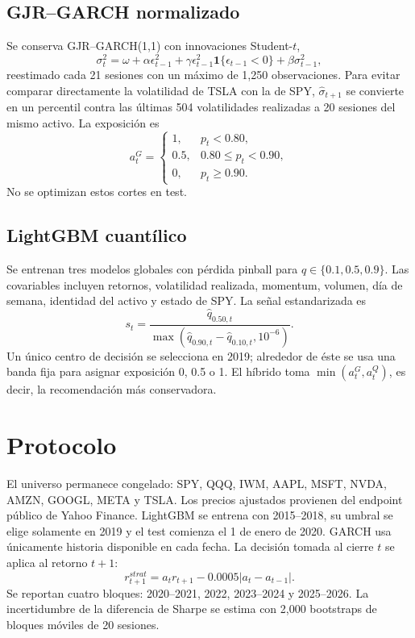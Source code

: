 \documentclass[11pt]{article}
\begin{document}
\subsection{GJR--GARCH normalizado}
Se conserva GJR--GARCH(1,1) con innovaciones Student-$t$,
\begin{equation}
 \sigma_t^2=\omega+\alpha\epsilon_{t-1}^2+
 \gamma\epsilon_{t-1}^2\mathbf 1\{\epsilon_{t-1}<0\}+\beta\sigma_{t-1}^2,
\end{equation}
reestimado cada 21 sesiones con un máximo de 1,250 observaciones. Para evitar comparar directamente la
volatilidad de TSLA con la de SPY, $\hat\sigma_{t+1}$ se convierte en un percentil contra las últimas 504
volatilidades realizadas a 20 sesiones del mismo activo. La exposición es
\begin{equation}
a_t^{G}=\begin{cases}
1,&p_t<0.80,\\
0.5,&0.80\le p_t<0.90,\\
0,&p_t\ge0.90.
\end{cases}
\end{equation}
No se optimizan estos cortes en test.

\subsection{LightGBM cuantílico}
Se entrenan tres modelos globales con pérdida pinball para $q\in\{0.1,0.5,0.9\}$. Las covariables incluyen
retornos, volatilidad realizada, momentum, volumen, día de semana, identidad del activo y estado de SPY. La
señal estandarizada es
\begin{equation}
s_t=\frac{\hat q_{0.50,t}}{\max(\hat q_{0.90,t}-\hat q_{0.10,t},10^{-6})}.
\end{equation}
Un único centro de decisión se selecciona en 2019; alrededor de éste se usa una banda fija para asignar
exposición 0, 0.5 o 1. El híbrido toma $\min(a_t^G,a_t^Q)$, es decir, la recomendación más conservadora.

\section{Protocolo}
El universo permanece congelado: SPY, QQQ, IWM, AAPL, MSFT, NVDA, AMZN, GOOGL, META y TSLA. Los precios
ajustados provienen del endpoint público de Yahoo Finance. LightGBM se entrena con 2015--2018, su umbral se
elige solamente en 2019 y el test comienza el 1 de enero de 2020. GARCH usa únicamente historia disponible en
cada fecha. La decisión tomada al cierre $t$ se aplica al retorno $t+1$:
\begin{equation}
r^{strat}_{t+1}=a_t r_{t+1}-0.0005|a_t-a_{t-1}|.
\end{equation}
Se reportan cuatro bloques: 2020--2021, 2022, 2023--2024 y 2025--2026. La incertidumbre de la diferencia de
Sharpe se estima con 2,000 bootstraps de bloques móviles de 20 sesiones.
\end{document}
